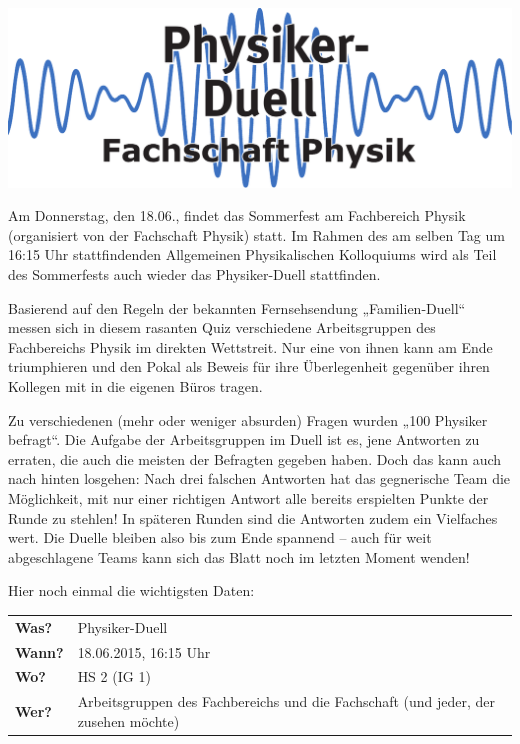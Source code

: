 \documentclass[a4paper, 12pt, pagesize, parskip=half-]{scrartcl}
\begin{document}
\begin{center}
	\includegraphics[width=\textwidth]{Physikerduell_Logo.pdf}
\end{center}

\bigskip

Am Donnerstag, den 18.06., findet das Sommerfest am Fachbereich Physik (organisiert von der Fachschaft
Physik) statt. Im Rahmen des am selben Tag um 16:15 Uhr stattfindenden Allgemeinen Physikalischen
Kolloquiums wird als Teil des Sommerfests auch wieder das Physiker-Duell stattfinden.

Basierend auf den Regeln der bekannten Fernsehsendung „Familien-Duell“ messen sich in diesem
rasanten Quiz verschiedene Arbeitsgruppen des Fachbereichs Physik im direkten Wettstreit.
Nur eine von ihnen kann am Ende triumphieren und den Pokal als Beweis für ihre Überlegenheit
gegenüber ihren Kollegen mit in die eigenen Büros tragen.

Zu verschiedenen (mehr oder weniger absurden) Fragen wurden „100 Physiker befragt“. Die Aufgabe
der Arbeitsgruppen im Duell ist es, jene Antworten zu erraten, die auch die meisten der Befragten
gegeben haben. Doch das kann auch nach hinten losgehen: Nach drei falschen Antworten hat das
gegnerische Team die Möglichkeit, mit nur einer richtigen Antwort alle bereits erspielten
Punkte der Runde zu stehlen! In späteren Runden sind die Antworten zudem ein Vielfaches wert.
Die Duelle bleiben also bis zum Ende spannend – auch für weit abgeschlagene Teams kann sich
das Blatt noch im letzten Moment wenden!

Hier noch einmal die wichtigsten Daten:

\bigskip
\Large
\begin{tabular}{lp{12.5cm}}
\textbf{Was?}	& Physiker-Duell \\
\textbf{Wann?}	& 18.06.2015, 16:15 Uhr \\
\textbf{Wo?}	& HS 2 (IG 1) \\
\textbf{Wer?}	& Arbeitsgruppen des Fachbereichs und die Fachschaft (und jeder, der zusehen möchte) \\
\end{tabular}
\end{document}
